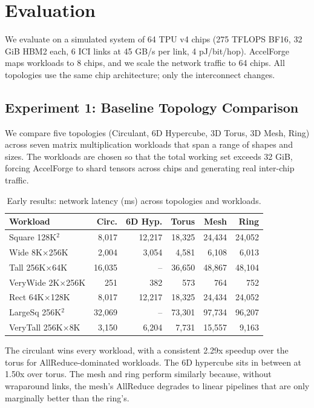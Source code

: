 \documentclass[conference,onecolumn]{IEEEtran}
\begin{document}
\section{Evaluation}

We evaluate on a simulated system of 64 TPU v4 chips (275 TFLOPS BF16, 32 GiB HBM2 each, 6 ICI links at 45 GB/s per link, 4 pJ/bit/hop). AccelForge maps workloads to 8 chips, and we scale the network traffic to 64 chips. All topologies use the same chip architecture; only the interconnect changes.

\subsection{Experiment 1: Baseline Topology Comparison}

We compare five topologies (Circulant, 6D Hypercube, 3D Torus, 3D Mesh, Ring) across seven matrix multiplication workloads that span a range of shapes and sizes. The workloads are chosen so that the total working set exceeds 32 GiB, forcing AccelForge to shard tensors across chips and generating real inter-chip traffic.

\begin{table}[h]
\centering
\caption{Early results: network latency (ms) across topologies and workloads.}
\label{tab:latency}
\begin{tabular}{l r r r r r}
\toprule
Workload & Circ. & 6D Hyp. & Torus & Mesh & Ring \\
\midrule
Square 128K$^2$   & 8,017 & 12,217 & 18,325 & 24,434 & 24,052 \\
Wide 8K$\times$256K     & 2,004 & 3,054 & 4,581 & 6,108 & 6,013 \\
Tall 256K$\times$64K    & 16,035 & -- & 36,650 & 48,867 & 48,104 \\
VeryWide 2K$\times$256K & 251 & 382 & 573 & 764 & 752 \\
Rect 64K$\times$128K    & 8,017 & 12,217 & 18,325 & 24,434 & 24,052 \\
LargeSq 256K$^2$  & 32,069 & -- & 73,301 & 97,734 & 96,207 \\
VeryTall 256K$\times$8K & 3,150 & 6,204 & 7,731 & 15,557 & 9,163 \\
\bottomrule
\end{tabular}
\end{table}

The circulant wins every workload, with a consistent 2.29x speedup over the torus for AllReduce-dominated workloads. The 6D hypercube sits in between at 1.50x over torus. The mesh and ring perform similarly because, without wraparound links, the mesh's AllReduce degrades to linear pipelines that are only marginally better than the ring's.
\end{document}
